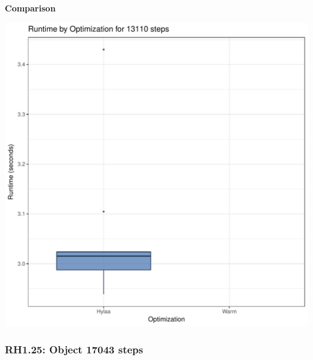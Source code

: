 \documentclass{article}\usepackage[]{graphicx}\usepackage[]{color}
\makeatletter
\def\maxwidth{ %
  \ifdim\Gin@nat@width>\linewidth
    \linewidth
  \else
    \Gin@nat@width
  \fi
}
\newenvironment{knitrout}{}{} %
\makeatother
\begin{document}
 \textbf{Comparison}
  
\begin{knitrout}
\color{fgcolor}
\includegraphics[width=\maxwidth]{figure/RH1_steps13110-1} 

\end{knitrout}


\subsubsection{RH1.25: Object 17043 steps}
\end{document}
